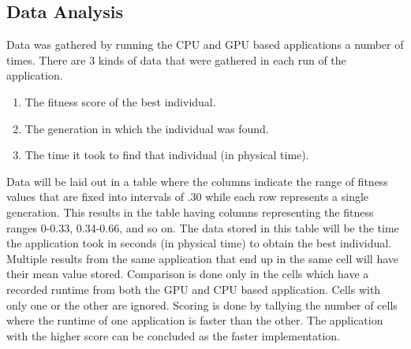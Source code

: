 \subsection{Data Analysis}
Data was gathered by running the CPU and GPU based applications a number of
times. There are 3 kinds of data that were gathered in each run of the application.

\begin{enumerate}
  \item The fitness score of the best individual.
  \item The generation in which the individual was found.
  \item The time it took to find that individual (in physical time).
\end{enumerate}

Data will be laid out in a table where the columns indicate the range of fitness
values that are fixed into intervals of .30 while each row represents a single
generation. This results in the table having columns representing the fitness
ranges 0-0.33, 0.34-0.66, and so on. The data stored in this table
will be the time the application took in seconds (in physical time) to obtain
the best individual. Multiple results from the same application that end up in
the same cell will have their mean value stored. Comparison is done only in the
cells which have a recorded runtime from both the GPU and CPU based application.
Cells with only one or the other are ignored. Scoring is done by tallying the
number of cells where the runtime of one application is faster than the other.
The application with the higher score can be concluded as the faster 
implementation.